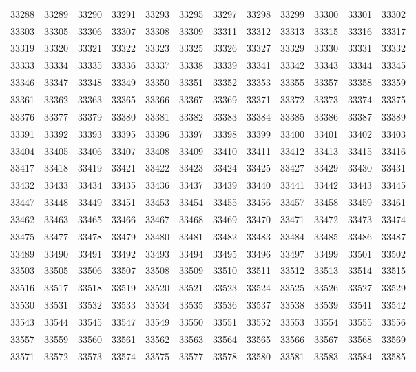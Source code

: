 \begin{center}
\begin{longtable}{llllllllllll}
33288 &33289 &33290 &33291 &33293 &33295 &33297 &33298 &33299 &33300 &33301 &33302 \\
33303 &33305 &33306 &33307 &33308 &33309 &33311 &33312 &33313 &33315 &33316 &33317 \\
33319 &33320 &33321 &33322 &33323 &33325 &33326 &33327 &33329 &33330 &33331 &33332 \\
33333 &33334 &33335 &33336 &33337 &33338 &33339 &33341 &33342 &33343 &33344 &33345 \\
33346 &33347 &33348 &33349 &33350 &33351 &33352 &33353 &33355 &33357 &33358 &33359 \\
33361 &33362 &33363 &33365 &33366 &33367 &33369 &33371 &33372 &33373 &33374 &33375 \\
33376 &33377 &33379 &33380 &33381 &33382 &33383 &33384 &33385 &33386 &33387 &33389 \\
33391 &33392 &33393 &33395 &33396 &33397 &33398 &33399 &33400 &33401 &33402 &33403 \\
33404 &33405 &33406 &33407 &33408 &33409 &33410 &33411 &33412 &33413 &33415 &33416 \\
33417 &33418 &33419 &33421 &33422 &33423 &33424 &33425 &33427 &33429 &33430 &33431 \\
33432 &33433 &33434 &33435 &33436 &33437 &33439 &33440 &33441 &33442 &33443 &33445 \\
33447 &33448 &33449 &33451 &33453 &33454 &33455 &33456 &33457 &33458 &33459 &33461 \\
33462 &33463 &33465 &33466 &33467 &33468 &33469 &33470 &33471 &33472 &33473 &33474 \\
33475 &33477 &33478 &33479 &33480 &33481 &33482 &33483 &33484 &33485 &33486 &33487 \\
33489 &33490 &33491 &33492 &33493 &33494 &33495 &33496 &33497 &33499 &33501 &33502 \\
33503 &33505 &33506 &33507 &33508 &33509 &33510 &33511 &33512 &33513 &33514 &33515 \\
33516 &33517 &33518 &33519 &33520 &33521 &33523 &33524 &33525 &33526 &33527 &33529 \\
33530 &33531 &33532 &33533 &33534 &33535 &33536 &33537 &33538 &33539 &33541 &33542 \\
33543 &33544 &33545 &33547 &33549 &33550 &33551 &33552 &33553 &33554 &33555 &33556 \\
33557 &33559 &33560 &33561 &33562 &33563 &33564 &33565 &33566 &33567 &33568 &33569 \\
33571 &33572 &33573 &33574 &33575 &33577 &33578 &33580 &33581 &33583 &33584 &33585 \\

\end{longtable}
\end{center}
